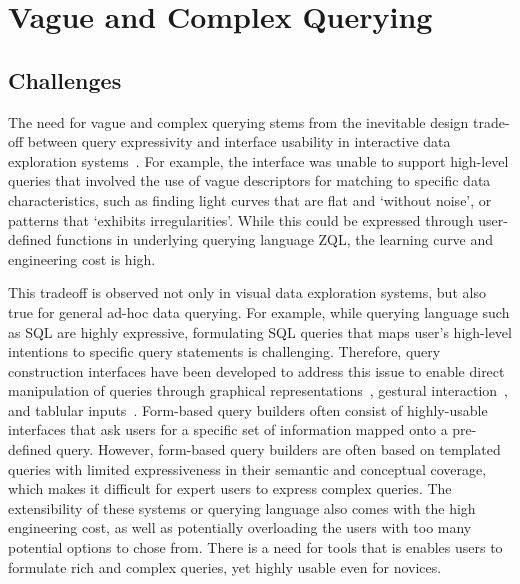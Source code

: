 \section{Vague and Complex Querying\label{sec:vague}}
\subsection{Challenges}
\par The need for vague and complex querying stems from the inevitable design trade-off between query expressivity and interface usability in interactive data exploration systems~\cite{Morton2014,Jagadish2007}. For example, the \zv interface was unable to support high-level queries that involved the use of vague descriptors for matching to specific data characteristics, such as finding light curves that are flat and `without noise', or patterns that `exhibits irregularities'. While this could be expressed through user-defined functions in underlying querying language ZQL, the learning curve and engineering cost is high.
\par This tradeoff is observed not only in visual data exploration systems, but also true for general ad-hoc data querying. For example, while querying language such as SQL are highly expressive, formulating SQL queries that maps user's high-level intentions to specific query statements is challenging. Therefore, query construction interfaces have been developed to address this issue to enable direct manipulation of queries through graphical representations~\cite{Abouzied2012}, gestural interaction~\cite{Nandi2013}, and tablular inputs~\cite{Zloof1975}. Form-based query builders often consist of highly-usable interfaces that ask users for a specific set of information mapped onto a pre-defined query. However, form-based query builders are often based on templated queries with limited expressiveness in their semantic and conceptual coverage, which makes it difficult for expert users to express complex queries. The extensibility of these systems or querying language also comes with the high engineering cost, as well as potentially overloading the users with too many potential options to chose from. There is a need for tools that is enables users to formulate rich and complex queries, yet highly usable even for novices.  

